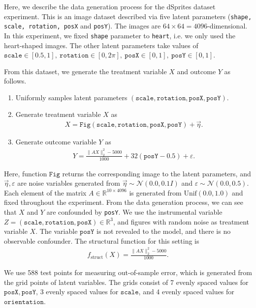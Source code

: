 
Here, we describe the data generation process for the dSprites dataset experiment. This is an image dataset described via five latent parameters ({\tt shape,  scale, rotation, posX} and {\tt posY}). The images are $64 \times 64 = 4096$-dimensional. In this experiment, we fixed {\tt shape} parameter to {\tt heart}, i.e. we only used the heart-shaped images. The other latent parameters take values of $ \mathtt{scale}\in [0.5, 1],~\mathtt{rotation} \in [0, 2\pi],~\mathtt{posX} \in [0,1],~\mathtt {posY} \in [0, 1]$.

From this dataset, we generate the treatment variable $X$ and outcome $Y$ as follows.
\begin{enumerate}
    \item Uniformly samples latent parameters $(\mathtt{scale}, \mathtt{rotation}, \mathtt{posX}, \mathtt{posY})$.
    \item Generate treatment variable $X$ as
    \begin{align*}
        X = \mathtt{Fig}(\mathtt{scale}, \mathtt{rotation}, \mathtt{posX}, \mathtt{posY}) + \vec{\eta}.
    \end{align*}
    \item Generate outcome variable $Y$  as
    \begin{align*}
        Y = \frac{\|AX\|_2^2 - 5000}{1000} + 32(\mathtt{posY}-0.5) + \varepsilon.
    \end{align*}
\end{enumerate}

Here, function $\mathtt{Fig}$ returns the corresponding image to the latent parameters, and $\vec{\eta}, \varepsilon$ are noise variables generated from $\vec{\eta} \sim \mathcal{N}(0.0, 0.1I)$ and $\varepsilon \sim \mathcal{N}(0.0, 0.5)$. Each element of the matrix $A \in \mathbb{R}^{10\times 4096}$ is generated from $\mathrm{Unif}(0.0, 1.0)$ and fixed throughout the experiment. From the data generation process, we can see that $X$ and $Y$ are confounded by {\tt posY}. We use the instrumental variable $Z = (\mathtt{scale},\mathtt{rotation}, \mathtt{posX}) \in \mathbb{R}^3$, and figures with random noise as treatment variable $X$.  The variable $\mathtt{posY}$ is not revealed to the model, and there is no observable confounder. The structural function for this setting is
\begin{align*}
    f_{\mathrm{struct}}(X) = \frac{\|AX\|_2^2 - 5000}{1000}.
\end{align*}

We use 588 test points for measuring out-of-sample error, which is generated from the grid points of latent variables. The grids consist of 7 evenly spaced values for $\mathtt{posX}, \mathtt{posY}$, 3 evenly spaced values for $\mathtt{scale}$, and 4 evenly spaced values for $\mathtt{orientation}$.